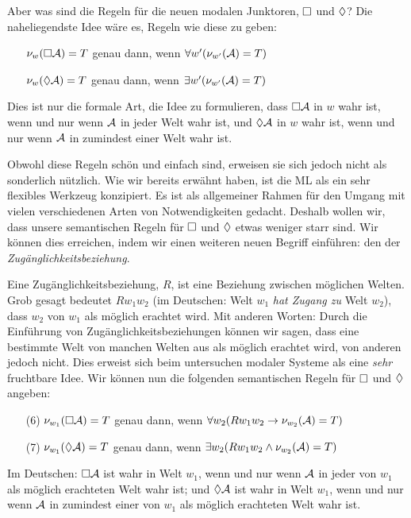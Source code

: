 Aber was sind die Regeln für die neuen modalen Junktoren, $\Box$ und $\Diamond$? Die naheliegendste Idee wäre es, Regeln wie diese zu geben:
\begin{itemize}
	\item[]$\nu_w(\Box \mathcal{A})=T$ genau dann, wenn $\forall w' (\nu_{w'}(\mathcal{A})=T)$
	\item[]$\nu_w(\Diamond \mathcal{A})=T$ genau dann, wenn $\exists w' (\nu_{w'}(\mathcal{A})=T)$
\end{itemize}
Dies ist nur die formale Art, die Idee zu formulieren, dass $\Box\mathcal{A}$ in $w$ wahr ist, wenn und nur wenn $\mathcal{A}$ in jeder Welt wahr ist, und $\Diamond\mathcal{A}$ in $w$ wahr ist, wenn und nur wenn $\mathcal{A}$ in zumindest einer Welt wahr ist.
 
Obwohl diese Regeln schön und einfach sind, erweisen sie sich jedoch nicht als sonderlich nützlich. Wie wir bereits erwähnt haben, ist die ML als ein sehr flexibles Werkzeug konzipiert. Es ist als allgemeiner Rahmen für den Umgang mit vielen verschiedenen Arten von Notwendigkeiten gedacht. Deshalb wollen wir, dass unsere semantischen Regeln für $\Box$ und $\Diamond$ etwas weniger starr sind. Wir können dies erreichen, indem wir einen weiteren neuen Begriff einführen: den der \emph{Zugänglichkeitsbeziehung}.

Eine Zugänglichkeitsbeziehung, $R$, ist eine Beziehung zwischen möglichen Welten. Grob gesagt bedeutet $Rw_1w_2$ (im Deutschen: Welt $w_1$ \emph{hat Zugang zu} Welt $w_2$), dass $w_2$ von $w_1$ als möglich erachtet wird. Mit anderen Worten: Durch die Einführung von Zugänglichkeitsbeziehungen können wir sagen, dass eine bestimmte Welt von manchen Welten aus als möglich erachtet wird, von anderen jedoch nicht. Dies erweist sich beim untersuchen modaler Systeme als eine \emph{sehr} fruchtbare Idee. Wir können nun die folgenden semantischen Regeln für $\Box$ und $\Diamond$ angeben:
\begin{itemize}
	\item[(6)]$\nu_{w_1}(\Box \mathcal{A})=T$ genau dann, wenn $\forall w_2 (Rw_1w_2\rightarrow \nu_{w_2}(\mathcal{A})=T)$
	\item[(7)]$\nu_{w_1}(\Diamond \mathcal{A})=T$ genau dann, wenn $\exists w_2 (Rw_1w_2\wedge \nu_{w_2}(\mathcal{A})=T)$
\end{itemize}
Im Deutschen: $\Box\mathcal{A}$ ist wahr in Welt $w_1$, wenn und nur wenn $\mathcal{A}$ in jeder von $w_1$ als möglich erachteten Welt wahr ist; und $\Diamond\mathcal{A}$ ist wahr in Welt $w_1$, wenn und nur wenn $\mathcal{A}$ in zumindest einer von $w_1$ als möglich erachteten Welt wahr ist.


